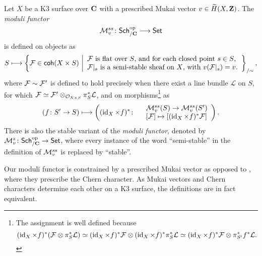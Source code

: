 \begin{definition}
    \label{Definition of moduli functor}
    Let $X$ be a K3 surface over $\mathbf C$ with a prescribed Mukai vector $v \in \widetilde{H}(X, \mathbf Z)$. The \emph{moduli functor}
    \[
        \mathcal M_v^{ss} \colon \mathsf{Sch}_{/\mathbf C}^{\text{op}} \longrightarrow \mathsf{Set}
    \]
    is defined on objects as 
    \[
        S \longmapsto \left\{\mathcal F \in \mathsf{coh}(X \times S) \ \middle| 
        \begin{array}{l}
            \text{$\mathcal F$ is flat over $S$, and for each closed point $s \in S$,} \\
            \text{$\mathcal F|_s$ is a semi-stable sheaf on $X$, with $v(\mathcal F|_s) = v$.}
        \end{array}
        \right\}_{/\sim},
    \]
    where $\mathcal F \sim \mathcal F'$ is defined to hold precisely when there exist a line bundle $\mathcal L$ on $S$, for which $\mathcal F \simeq \mathcal F' \otimes_{{\mathcal{O}_{X \times S}}} \pi_S^*\mathcal L$, and on morphisms\footnote{
                    The assignment is well defined because
                    \[
                        (\operatorname{id}_{X} \times f)^*(\mathcal F \otimes \pi_S^*\mathcal L) \simeq (\operatorname{id}_{X} \times f)^*\mathcal F \otimes (\operatorname{id}_{X} \times f)^*\pi_S^*\mathcal L \simeq (\operatorname{id}_{X} \times f)^*\mathcal F \otimes \pi_{S'}^*f^*\mathcal L.
                    \]
                } as
    \[
        (f\colon S' \to S) \longmapsto \left( (\operatorname{id}_{X} \times f)^* \colon
            \begin{array}{r l}
                & \mathcal M^{ss}_v(S) \to \mathcal M^{ss}_v(S') \\
                & [\mathcal F] \mapsto [(\operatorname{id}_{X} \times f)^*\mathcal F]
            \end{array}
            \right).
    \]
    There is also the stable variant of the \emph{moduli functor}, denoted by $\mathcal M_v^{s} \colon \mathsf{Sch}_{/\mathbf C}^{\text{op}} \to \mathsf{Set}$, where every instance of the word ``semi-stable'' in the definition of $\mathcal M_v^{ss}$ is replaced by ``stable''.
\end{definition}

\begin{remark}
    Our moduli functor is constrained by a prescribed Mukai vector as opposed to \cite[\S 4.2, Proposition 4.15]{vanBree2020}, where they prescribe the Chern character.
    As Mukai vectors and Chern characters determine each other on a K3 surface, the definitions are in fact equivalent. 
\end{remark}

